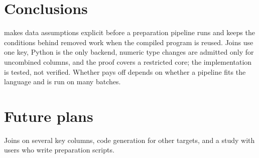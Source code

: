 \section{Conclusions}

\PL makes data assumptions explicit before a preparation pipeline runs and keeps the conditions behind
removed work when the compiled program is reused. Joins use one key, Python is the only backend, numeric
type changes are admitted only for uncombined columns, and the proof covers a restricted core; the
implementation is tested, not verified. Whether \PL pays off depends on whether a pipeline fits the
language and is run on many batches.

\section{Future plans}

Joins on several key columns, code generation for other targets, and a study with users who write
preparation scripts.
